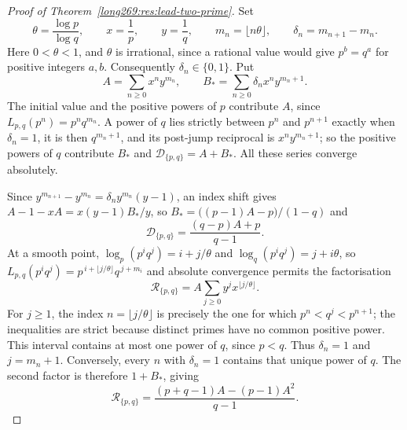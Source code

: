\begin{proof}[Proof of Theorem~\ref{long269:res:lead-two-prime}]
Set
\[
 \theta=\frac{\log p}{\log q},\qquad x=\frac1p,\qquad y=\frac1q,\qquad
 m_n=\lfloor n\theta\rfloor,\qquad \delta_n=m_{n+1}-m_n .
\]
Here $0<\theta<1$, and $\theta$ is irrational, since a rational value would
give $p^{b}=q^{a}$ for positive integers $a,b$.  Consequently
$\delta_n\in\{0,1\}$.  Put
\[
 A=\sum_{n\ge0}x^ny^{m_n},
 \qquad
 B_\ast=\sum_{n\ge0}\delta_nx^ny^{m_n+1} .
\]
The initial value and the positive powers of $p$ contribute $A$, since
$L_{p,q}(p^n)=p^nq^{m_n}$.  A power of $q$ lies strictly between $p^n$ and
$p^{n+1}$ exactly when $\delta_n=1$, it is then $q^{m_n+1}$, and its post-jump
reciprocal is $x^ny^{m_n+1}$; so the positive powers of $q$ contribute $B_\ast$ and
$\mathcal D_{\{p,q\}}=A+B_\ast$.  All these series converge absolutely.

Since $y^{m_{n+1}}-y^{m_n}=\delta_ny^{m_n}(y-1)$, an index shift gives
$A-1-xA=x(y-1)B_\ast/y$, so $B_\ast=\bigl((p-1)A-p\bigr)/(1-q)$ and
\begin{equation}\label{long269:eq:two-prime-affine}
 \mathcal D_{\{p,q\}}=\frac{(q-p)A+p}{q-1} .
\end{equation}
At a smooth point, $\log_p(p^iq^j)=i+j/\theta$ and
$\log_q(p^iq^j)=j+i\theta$, so
$L_{p,q}(p^iq^j)=p^{\,i+\lfloor j/\theta\rfloor}q^{\,j+m_i}$ and absolute
convergence permits the factorisation
\[
 \mathcal R_{\{p,q\}}=A\sum_{j\ge0}y^jx^{\lfloor j/\theta\rfloor}.
\]
For $j\ge1$, the index $n=\lfloor j/\theta\rfloor$ is precisely the one
for which $p^n<q^j<p^{n+1}$; the inequalities are strict because distinct
primes have no common positive power.  This interval contains at most one
power of $q$, since $p<q$.  Thus $\delta_n=1$ and $j=m_n+1$.
Conversely, every $n$ with $\delta_n=1$ contains that unique power of $q$.
The second factor is therefore $1+B_\ast$, giving
\begin{equation}\label{long269:eq:two-prime-quadratic}
 \mathcal R_{\{p,q\}}
 =\frac{(p+q-1)A-(p-1)A^{2}}{q-1} .
\end{equation}


\end{proof}
